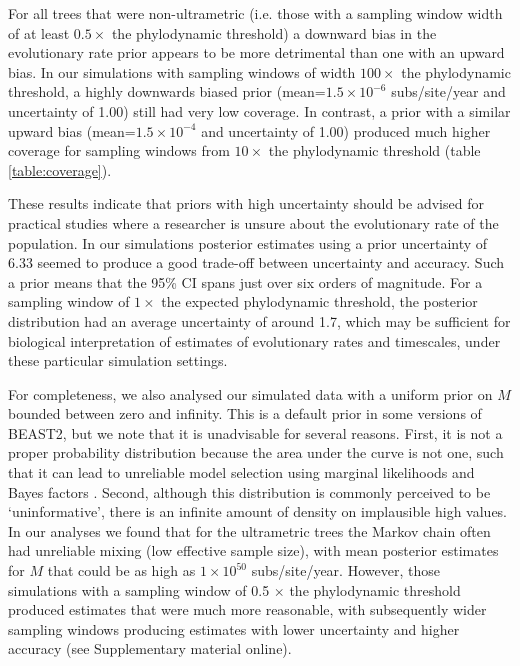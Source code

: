 \documentclass[11pt]{article}
\begin{document}
For all trees that were non-ultrametric (i.e. those with a sampling window width of at least $0.5\times$ the phylodynamic threshold) a downward bias in the evolutionary rate prior appears to be more detrimental than one with an upward bias. In our simulations with sampling windows of width $100\times$ the phylodynamic threshold, a highly downwards biased prior (mean=$1.5\times 10^{-6}$ subs/site/year and uncertainty of 1.00) still had very low coverage. In contrast, a prior with a similar upward bias (mean=$1.5\times 10^{-4}$ and uncertainty of 1.00) produced much higher coverage for sampling windows from $10\times$ the phylodynamic threshold (table \ref{table:coverage}). 

These results indicate that priors with high uncertainty should be advised for practical studies where a researcher is unsure about the evolutionary rate of the population. In our simulations posterior estimates using a prior uncertainty of 6.33 seemed to produce a good trade-off between uncertainty and accuracy. Such a prior means that the 95\% CI spans just over six orders of magnitude. For a sampling window of $1\times$ the expected phylodynamic threshold, the posterior distribution had an average uncertainty of around 1.7, which may be sufficient for biological interpretation of estimates of evolutionary rates and timescales, under these particular simulation settings.

For completeness, we also analysed our simulated data with a uniform prior on $M$ bounded between zero and infinity. This is a default prior in some versions of BEAST2, but we note that it is unadvisable for several reasons. First, it is not a proper probability distribution because the area under the curve is not one, such that it can lead to unreliable model selection using marginal likelihoods and Bayes factors \citep{r2019marginal, fourment202019}. Second, although this distribution is commonly perceived to be `uninformative', there is an infinite amount of density on implausible high values. In our analyses we found that for the ultrametric trees the Markov chain often had unreliable mixing (low effective sample size), with mean posterior estimates for $M$ that could be as high as $1\times10^{50}$ subs/site/year. However, those simulations with a sampling window of 0.5 $\times$ the phylodynamic threshold produced estimates that were much more reasonable, with subsequently wider sampling windows producing estimates with lower uncertainty and higher accuracy (see Supplementary material online).
\end{document}
